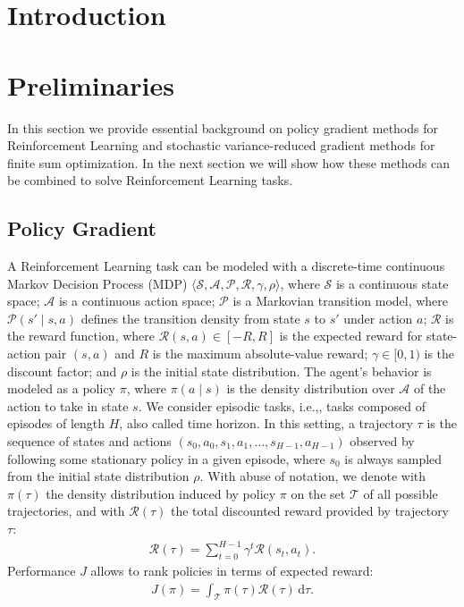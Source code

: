 \documentclass{article}
\makeatletter
\theoremstyle{remark}
\theoremstyle{definition}
\DeclareRobustCommand{\ie}{i.e.,\@\xspace}
\newcommand{\de}{\,\mathrm{d}}
\newcommand{\Aspace}{\mathcal{A}}
\newcommand{\Sspace}{\mathcal{S}}
\newcommand{\Tspace}{\mathcal{T}}
\newcommand{\Transition}{\mathcal{P}}
\newcommand{\Reward}{\mathcal{R}}
\makeatother
\begin{document}
\section{Introduction}

\section{Preliminaries}
In this section we provide essential background on policy gradient methods for Reinforcement Learning and stochastic variance-reduced gradient methods for finite sum optimization. In the next section we will show how these methods can be combined to solve Reinforcement Learning tasks.

\subsection{Policy Gradient}
A Reinforcement Learning task \cite{sutton2011reinforcement} can be modeled with a discrete-time continuous Markov Decision Process (MDP) $\langle\Sspace,\Aspace,\Transition,\Reward,\gamma,\rho\rangle$, where $\Sspace$ is a continuous state space; $\Aspace$ is a continuous action space; $\Transition$ is a Markovian transition model, where $\Transition(s'\mid s,a)$ defines the transition density from state $s$ to $s'$ under action $a$; $\Reward$ is the reward function, where $\Reward(s,a) \in [-R,R]$ is the expected reward for state-action pair $(s,a)$ and $R$ is the maximum absolute-value reward; $\gamma\in[0,1)$ is the discount factor; and $\rho$ is the initial state distribution.
The agent's behavior is modeled as a policy $\pi$, where $\pi(a\mid s)$ is the density distribution over $\Aspace$ of the action to take in state $s$.
We consider episodic tasks, \ie, tasks composed of episodes of length $H$, also called time horizon. In this setting, a trajectory $\tau$ is the sequence of states and actions $(s_0,a_0,s_1,a_1,\dots,s_{H-1},a_{H-1})$ observed by following some stationary policy in a given episode, where $s_0$ is always sampled from the initial state distribution $\rho$. With abuse of notation, we denote with $\pi(\tau)$ the density distribution induced by policy $\pi$ on the set $\Tspace$ of all possible trajectories, and with $\Reward(\tau)$ the total discounted reward provided by trajectory $\tau$:
\begin{align*}
\Reward(\tau) = \sum_{t=0}^{H-1}\gamma^t\Reward(s_t,a_t).
\end{align*}
Performance $J$ allows to rank policies in terms of expected reward:
\begin{align*}
	J(\pi) = \int_{\Tspace}\pi(\tau)\Reward(\tau)\de \tau.
\end{align*}
\end{document}
